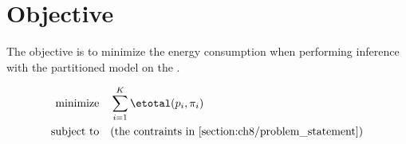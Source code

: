 \section{Objective}
The objective is to minimize the energy consumption when performing inference with the partitioned model on the \graicore{}.

\begin{align*}
    \textrm{minimize} & \quad \sum_{i=1}^{K} \etotal(p_i, \pi_i) \\
    \textrm{subject to} & \quad \textrm{(the contraints in \cref{section:ch8/problem_statement})}
\end{align*}
